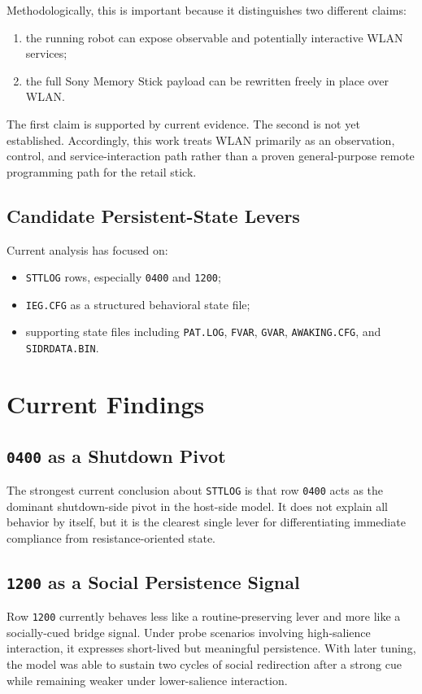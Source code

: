 \documentclass[11pt]{article}
\begin{document}
Methodologically, this is important because it distinguishes two different
claims:
\begin{enumerate}[leftmargin=*]
\item the running robot can expose observable and potentially interactive WLAN
services;
\item the full Sony Memory Stick payload can be rewritten freely in place over
WLAN.
\end{enumerate}

The first claim is supported by current evidence. The second is not yet
established. Accordingly, this work treats WLAN primarily as an observation,
control, and service-interaction path rather than a proven general-purpose
remote programming path for the retail stick.

\subsection{Candidate Persistent-State Levers}
Current analysis has focused on:
\begin{itemize}[leftmargin=*]
\item \texttt{STTLOG} rows, especially \texttt{0400} and \texttt{1200};
\item \texttt{IEG.CFG} as a structured behavioral state file;
\item supporting state files including \texttt{PAT.LOG}, \texttt{FVAR},
\texttt{GVAR}, \texttt{AWAKING.CFG}, and \texttt{SIDRDATA.BIN}.
\end{itemize}

\section{Current Findings}
\subsection{\texttt{0400} as a Shutdown Pivot}
The strongest current conclusion about \texttt{STTLOG} is that row
\texttt{0400} acts as the dominant shutdown-side pivot in the host-side model.
It does not explain all behavior by itself, but it is the clearest single
lever for differentiating immediate compliance from resistance-oriented state.

\subsection{\texttt{1200} as a Social Persistence Signal}
Row \texttt{1200} currently behaves less like a routine-preserving lever and
more like a socially-cued bridge signal. Under probe scenarios involving
high-salience interaction, it expresses short-lived but meaningful persistence.
With later tuning, the model was able to sustain two cycles of social
redirection after a strong cue while remaining weaker under lower-salience
interaction.
\end{document}
